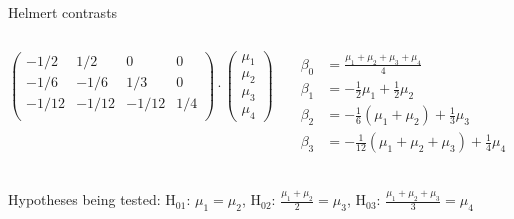 \documentclass[aspectratio=169]{beamer}
\begin{document}
\begin{frame}{Helmert contrasts}
\begin{columns}
\begin{column}[t]{.5\textwidth}
\[\begin{pmatrix}
  -1/2  &  1/2  &    0  &   0 \\ 
  -1/6  & -1/6  &  1/3  &   0 \\ 
  -1/12 & -1/12 & -1/12 & 1/4 \\ 
  \end{pmatrix} \cdot
  \begin{pmatrix}
    \mu_1 \\
    \mu_2 \\
    \mu_3 \\
    \mu_4
  \end{pmatrix}
\]
    \end{column}
    \begin{column}[t]{.5\textwidth}
\begin{align*}
  \beta_0 & = \frac{\mu_1 + \mu_2 + \mu_3 + \mu_4}{4} \\
  \beta_1 & = -\frac{1}{2}\mu_1 + \frac{1}{2}\mu_2 \\
  \beta_2 & = -\frac{1}{6}(\mu_1 + \mu_2) + \frac{1}{3}\mu_3 \\
  \beta_3 & = -\frac{1}{12}(\mu_1 + \mu_2 + \mu_3) + \frac{1}{4}\mu_4 \\
\end{align*}
    \end{column}
  \end{columns}
  \vspace{-.8cm}
Hypotheses being tested:
H$_{01}$: $\mu_1 = \mu_2$,
H$_{02}$: $\frac{\mu_1 + \mu_2}{2} = \mu_3$,
H$_{03}$: $\frac{\mu_1 + \mu_2 + \mu_3}{3} = \mu_4$
\end{frame}
\end{document}
